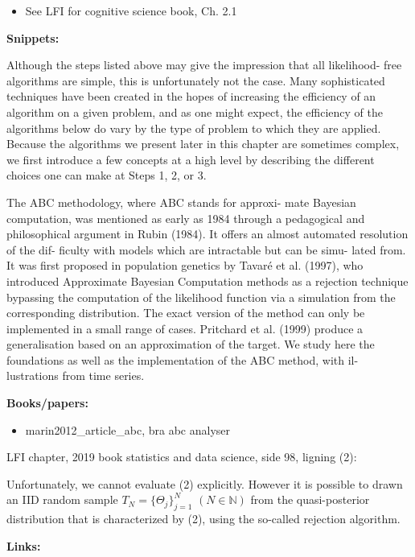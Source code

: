 \begin{itemize}
    \item See LFI for cognitive science book, Ch. 2.1
\end{itemize}

\textbf{Snippets:}

Although the steps listed above may give the impression that all likelihood- free algorithms are simple, this is unfortunately not the case. Many sophisticated techniques have been created in the hopes of increasing the efficiency of an algorithm on a given problem, and as one might expect, the efficiency of the algorithms below do vary by the type of problem to which they are applied. Because the algorithms we present later in this chapter are sometimes complex, we first introduce a few concepts at a high level by describing the different choices one can make at Steps 1, 2, or 3. 

The ABC methodology, where ABC stands for approxi- mate Bayesian computation, was mentioned as early as 1984 through a pedagogical and philosophical argument in Rubin (1984). It offers an almost automated resolution of the dif- ficulty with models which are intractable but can be simu- lated from. It was first proposed in population genetics by Tavaré et al. (1997), who introduced Approximate Bayesian Computation methods as a rejection technique bypassing the computation of the likelihood function via a simulation from the corresponding distribution. The exact version of the method can only be implemented in a small range of cases. Pritchard et al. (1999) produce a generalisation based on an approximation of the target. We study here the foundations as well as the implementation of the ABC method, with il- lustrations from time series. 

\textbf{Books/papers:} 

\begin{itemize}
    \item marin2012\_article\_abc, bra abc analyser 
\end{itemize}

LFI chapter, 2019 book statistics and data science, side 98, ligning (2): 

Unfortunately, we cannot evaluate (2) explicitly. However it is possible to drawn an IID random sample $T_N = \{ \Theta_j \}_{j=1}^N$ $(N \in \mathbb{N})$ from the quasi-posterior distribution that is characterized by (2), using the so-called rejection algorithm. 

\textbf{Links:}

